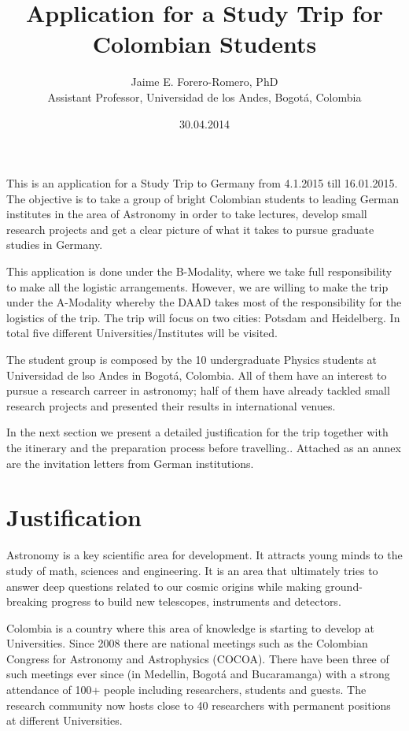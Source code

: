 \documentclass[12pt]{article}
\title{Application for a Study Trip for Colombian Students}
\author{Jaime E. Forero-Romero, PhD \\ {\small Assistant Professor, Universidad de los Andes, Bogot\'a, Colombia}}
\date{30.04.2014}
\begin{document}
\maketitle
This is an application for a Study Trip to Germany from 4.1.2015 till
16.01.2015. The objective is to take a group of bright Colombian students to
leading German institutes in the area of Astronomy in order to take lectures,
develop small research projects and get a clear picture of what it
takes to pursue graduate studies in Germany. 

This application is done under the B-Modality, where we take full
responsibility to make all the logistic arrangements. However, we are
willing to make the trip under the A-Modality whereby the DAAD takes
most of the responsibility for the logistics of the trip.  The trip will
focus on two cities: Potsdam and Heidelberg. In total  five different
Universities/Institutes will be visited. 
 
The student group is composed by the 10 undergraduate Physics students at
Universidad de lso Andes in Bogot\'a, Colombia. All of them have an
interest to pursue a research carreer in astronomy; half of them have
already tackled small research projects and presented their results in
international venues. 

In the next section we present a detailed justification for the trip
together with the itinerary and the preparation process before
travelling.. Attached as an annex are the invitation letters from
German institutions.

\newpage

\section{Justification}

Astronomy is a key scientific area for development. It attracts young
minds to the study of math, sciences and engineering. It is an area
that ultimately tries to answer deep questions related to our
cosmic origins while making ground-breaking progress to build new
telescopes, instruments and detectors.

Colombia is a country where this area of knowledge is starting to develop
at Universities. Since 2008 there are national meetings such as the
Colombian Congress for Astronomy and Astrophysics (COCOA). There have
been three of such meetings ever since (in Medellin, Bogot\'a and Bucaramanga)
with a strong attendance of 100+ people including researchers,
students and guests. The research community now hosts close to 40
researchers with permanent positions at different Universities.
\end{document}
